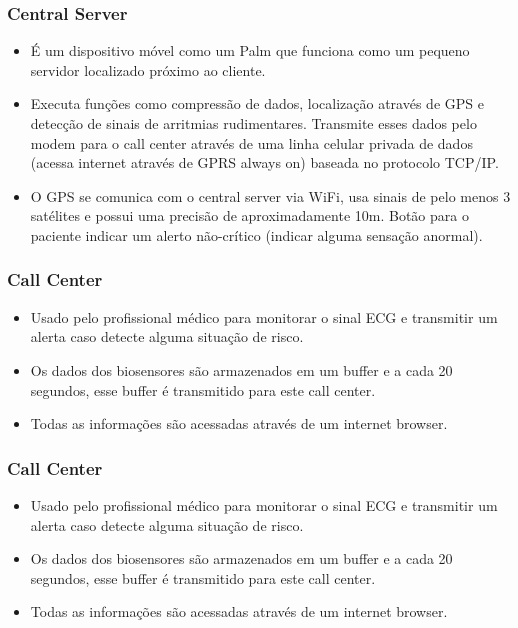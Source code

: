 \documentclass{beamer}
\begin{document}

\begin{frame}
\frametitle{Central Server}

	\begin{itemize}
		\item É um dispositivo móvel como um Palm que funciona como um pequeno servidor localizado próximo ao cliente. 
		\item Executa funções como compressão de dados, localização através de GPS e detecção de sinais de arritmias rudimentares. Transmite esses dados pelo modem para o call center através de uma linha celular privada de dados (acessa internet através de GPRS always on) baseada no protocolo TCP/IP. 
		\item O GPS se comunica com o central server via WiFi, usa sinais de pelo menos 3 satélites e possui uma precisão de aproximadamente 10m.
		Botão para o paciente indicar um alerto não-crítico (indicar alguma sensação anormal).
	\end{itemize}
\end{frame}


\begin{frame}
\frametitle{Call Center}

	\begin{itemize}
		\item Usado pelo profissional médico para monitorar o sinal ECG e transmitir um alerta caso detecte alguma situação de risco. 
		\item Os dados dos biosensores são armazenados em um buffer e a cada 20 segundos, esse buffer é transmitido para este call center. 
		\item Todas as informações são acessadas através de um internet browser.
	\end{itemize}
\end{frame}


\begin{frame}
\frametitle{Call Center}

	\begin{itemize}
		\item Usado pelo profissional médico para monitorar o sinal ECG e transmitir um alerta caso detecte alguma situação de risco. 
		\item Os dados dos biosensores são armazenados em um buffer e a cada 20 segundos, esse buffer é transmitido para este call center. 
		\item Todas as informações são acessadas através de um internet browser.
	\end{itemize}
\end{frame}
\end{document}
